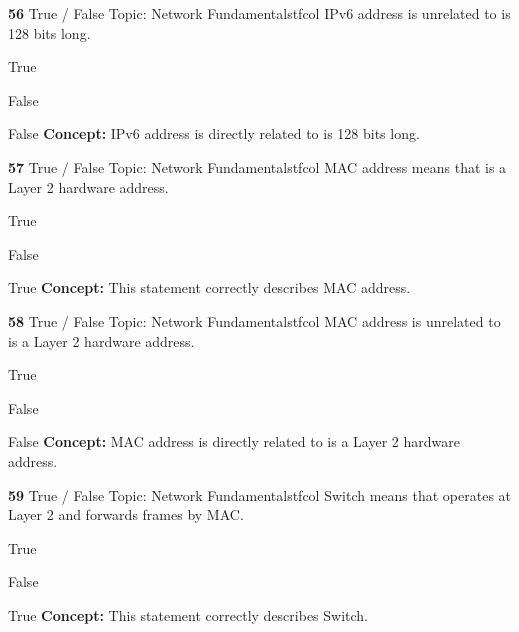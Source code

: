 \documentclass[10pt,a4paper]{article}
\begin{document}
\begin{qcard}{\color{white}\textbf{56} \hfill \small True / False \textbar{} Topic: Network Fundamentals}{tfcol}
IPv6 address is unrelated to is 128 bits long.

\begin{qoptions}
\item True
\item False
\end{qoptions}
\begin{explainbox}{False}
\textbf{Concept:} IPv6 address is directly related to is 128 bits long.
\end{explainbox}
\end{qcard}

\begin{qcard}{\color{white}\textbf{57} \hfill \small True / False \textbar{} Topic: Network Fundamentals}{tfcol}
MAC address means that is a Layer 2 hardware address.

\begin{qoptions}
\item True
\item False
\end{qoptions}
\begin{explainbox}{True}
\textbf{Concept:} This statement correctly describes MAC address.
\end{explainbox}
\end{qcard}

\begin{qcard}{\color{white}\textbf{58} \hfill \small True / False \textbar{} Topic: Network Fundamentals}{tfcol}
MAC address is unrelated to is a Layer 2 hardware address.

\begin{qoptions}
\item True
\item False
\end{qoptions}
\begin{explainbox}{False}
\textbf{Concept:} MAC address is directly related to is a Layer 2 hardware address.
\end{explainbox}
\end{qcard}

\begin{qcard}{\color{white}\textbf{59} \hfill \small True / False \textbar{} Topic: Network Fundamentals}{tfcol}
Switch means that operates at Layer 2 and forwards frames by MAC.

\begin{qoptions}
\item True
\item False
\end{qoptions}
\begin{explainbox}{True}
\textbf{Concept:} This statement correctly describes Switch.
\end{explainbox}
\end{qcard}
\end{document}
